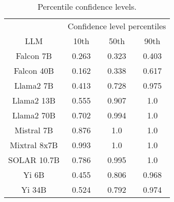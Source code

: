 \begin{table*}
\centering
\begin{tabular}{c|c|c|c}
& \multicolumn{3}{c}{Confidence level percentiles} \\ 
LLM & 10th & 50th & 90th\\ \hline
Falcon 7B & 0.263 & 0.323 & 0.403\\
Falcon 40B & 0.162 & 0.338 & 0.617\\
Llama2 7B & 0.413 & 0.728 & 0.975\\
Llama2 13B & 0.555 & 0.907 & 1.0\\
Llama2 70B & 0.702 & 0.994 & 1.0\\
Mistral 7B & 0.876 & 1.0 & 1.0\\
Mixtral 8x7B & 0.993 & 1.0 & 1.0\\
SOLAR 10.7B & 0.786 & 0.995 & 1.0\\
Yi 6B & 0.455 & 0.806 & 0.968\\
Yi 34B & 0.524 & 0.792 & 0.974\\
\hline
\end{tabular}
\caption{Percentile confidence levels.}
\label{tab:percentile_conf}
\end{table*}
